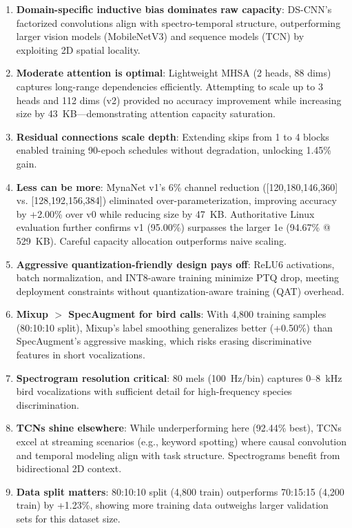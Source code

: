 \documentclass[conference]{IEEEtran}
\begin{document}
\begin{enumerate}
    \item \textbf{Domain-specific inductive bias dominates raw capacity}: DS-CNN's factorized convolutions align with spectro-temporal structure, outperforming larger vision models (MobileNetV3) and sequence models (TCN) by exploiting 2D spatial locality.

    \item \textbf{Moderate attention is optimal}: Lightweight MHSA (2 heads, 88 dims) captures long-range dependencies efficiently. Attempting to scale up to 3 heads and 112 dims (v2) provided no accuracy improvement while increasing size by 43~KB—demonstrating attention capacity saturation.

    \item \textbf{Residual connections scale depth}: Extending skips from 1 to 4 blocks enabled training 90-epoch schedules without degradation, unlocking 1.45\% gain.

    \item \textbf{Less can be more}: MynaNet v1's 6\% channel reduction ([120,180,146,360] vs. [128,192,156,384]) eliminated over-parameterization, improving accuracy by +2.00\% over v0 while reducing size by 47~KB. Authoritative Linux evaluation further confirms v1 (95.00\%) surpasses the larger 1e (94.67\% @ 529~KB). Careful capacity allocation outperforms naive scaling.

    \item \textbf{Aggressive quantization-friendly design pays off}: ReLU6 activations, batch normalization, and INT8-aware training minimize PTQ drop, meeting deployment constraints without quantization-aware training (QAT) overhead.

    \item \textbf{Mixup $>$ SpecAugment for bird calls}: With 4,800 training samples (80:10:10 split), Mixup's label smoothing generalizes better (+0.50\%) than SpecAugment's aggressive masking, which risks erasing discriminative features in short vocalizations.

    \item \textbf{Spectrogram resolution critical}: 80 mels (100~Hz/bin) captures 0--8~kHz bird vocalizations with sufficient detail for high-frequency species discrimination.

    \item \textbf{TCNs shine elsewhere}: While underperforming here (92.44\% best), TCNs excel at streaming scenarios (e.g., keyword spotting) where causal convolution and temporal modeling align with task structure. Spectrograms benefit from bidirectional 2D context.

    \item \textbf{Data split matters}: 80:10:10 split (4,800 train) outperforms 70:15:15 (4,200 train) by +1.23\%, showing more training data outweighs larger validation sets for this dataset size.
\end{enumerate}
\end{document}
